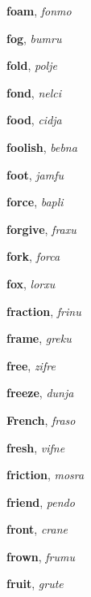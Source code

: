 \documentclass[12pt]{book}
\begin{document}
\begin{description}
\item[ ] \textbf{foam}, \textit{fonmo}

\item[ ] \textbf{fog}, \textit{bumru}

\item[ ] \textbf{fold}, \textit{polje}

\item[ ] \textbf{fond}, \textit{nelci}

\item[ ] \textbf{food}, \textit{cidja}

\item[ ] \textbf{foolish}, \textit{bebna}

\item[ ] \textbf{foot}, \textit{jamfu}

\item[ ] \textbf{force}, \textit{bapli}

\item[ ] \textbf{forgive}, \textit{fraxu}

\item[ ] \textbf{fork}, \textit{forca}

\item[ ] \textbf{fox}, \textit{lorxu}

\item[ ] \textbf{fraction}, \textit{frinu}

\item[ ] \textbf{frame}, \textit{greku}

\item[ ] \textbf{free}, \textit{zifre}

\item[ ] \textbf{freeze}, \textit{dunja}

\item[ ] \textbf{French}, \textit{fraso}

\item[ ] \textbf{fresh}, \textit{vifne}

\item[ ] \textbf{friction}, \textit{mosra}

\item[ ] \textbf{friend}, \textit{pendo}

\item[ ] \textbf{front}, \textit{crane}

\item[ ] \textbf{frown}, \textit{frumu}

\item[ ] \textbf{fruit}, \textit{grute}


\end{description}
\end{document}
